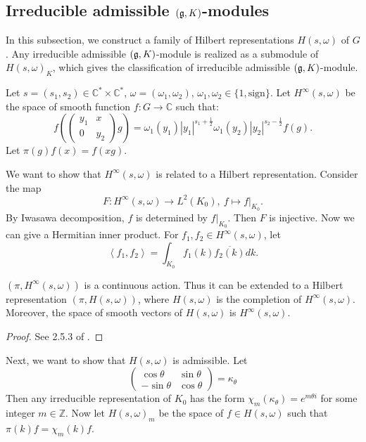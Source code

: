 \subsection{Irreducible admissible \texorpdfstring{$(\mathfrak g,K)$}{(g,K)}-modules}
In this subsection, we construct a family of Hilbert representations $H(s,\omega)$ of $G$. Any irreducible admissible $(\mathfrak g,K)$-module is realized as a submodule of $H(s,\omega)_K$, which gives the classification of irreducible admissible  $(\mathfrak g,K)$-module.

\begin{definition}
Let $s=(s_1,s_2)\in \mathbb C^*\times \mathbb C^*$, $\omega=(\omega_1,\omega_2)$, $\omega_1,\omega_2\in \{ 1,\mathrm {sign} \}$. Let $H^\infty(s,\omega)$ be the space of smooth function $f\colon G\to \mathbb C$ such that:
\[
f\left (\left (\begin{array} {cc}
y_1 & x\\
0 & y_2
\end{array} \right )g \right )=\omega_1(y_1)\left | y_1 \right | ^{s_1+ \frac 1 2}\omega_1(y_2) \left | y_2 \right |^ {s_2- \frac 1 2} f(g).
\]
Let $\pi(g) f(x)=f(xg)$.
\end{definition}

We want to show that $H^\infty(s,\omega)$ is related to a Hilbert representation.
Consider the map
\[
F\colon H^\infty (s,\omega)\to L^2(K_0), \ f\mapsto f|_{K_0}.
\]
By Iwasawa decomposition, $f$ is determined by $f|_{K_0}$. Then $F$ is injective. Now we can give a Hermitian inner product.
For $f_1,f_2\in H^\infty(s,\omega)$, let
\[
\left\langle f_1,f_2\right\rangle = \int_{K_0} f_1(k)\overline {f_2(k)} dk.
\]

\begin{proposition}
$(\pi, H^\infty (s,\omega))$ is a continuous action. Thus it can be extended to a Hilbert representation $(\pi, H(s,\omega))$, where $H(s,\omega)$ is the completion of $H^\infty (s,\omega)$. Moreover, the space of smooth vectors of $H(s,\omega)$ is $H^\infty(s,\omega)$.
\end{proposition}

\begin{proof}
See 2.5.3 of .
\end{proof}

Next, we want to show that $H(s,\omega)$ is admissible.
Let
\[
\left (\begin{array} {cc}
\cos \theta & \sin \theta\\
-\sin \theta & \cos \theta
\end{array} \right ) =\kappa_\theta
\]
Then any irreducible representation of $K_0$ has the form $\chi_m(\kappa _\theta )=e^{m\theta i}$ for some integer $m\in \mathbb Z$. Now let $H(s,\omega)_m$ be the space of $f\in H(s,\omega)$ such that $\pi(k)f=\chi_m(k) f$.

